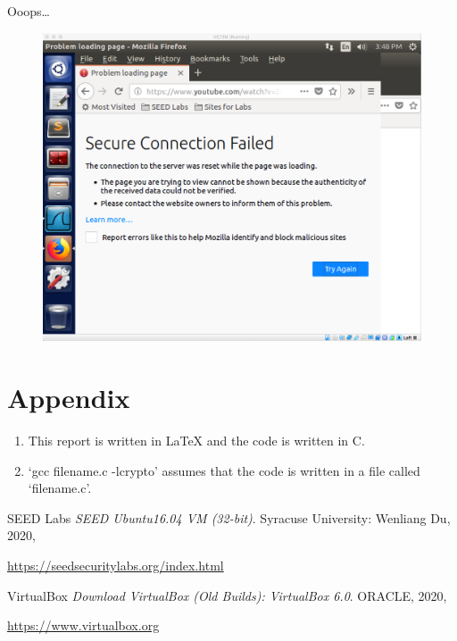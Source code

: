 \documentclass[12pt]{article}
\def\bsq#1{\lq{#1}\rq}
\begin{document}
\noindent
Ooops\dots

\begin{figure}[H]
    \centering
    \includegraphics[width=1\textwidth]{tcp-video-after.png}
\end{figure}



\newpage

\section{Appendix}

\begin{enumerate}
    \item This report is written in \LaTeX{} and the code is written in C.
    \item \bsq{gcc filename.c -lcrypto} assumes that the code is written in a file called \bsq{filename.c}.
\end{enumerate}

\begin{thebibliography}{9}

    SEED Labs
    \textit{SEED Ubuntu16.04 VM (32-bit)}.
    Syracuse University: Wenliang Du, 2020,

    \href{https://seedsecuritylabs.org/index.html}{https://seedsecuritylabs.org/index.html}

    VirtualBox
    \textit{Download VirtualBox (Old Builds): VirtualBox 6.0}.
    ORACLE, 2020,

    \href{https://www.virtualbox.org}{https://www.virtualbox.org}

\end{thebibliography}
\end{document}

